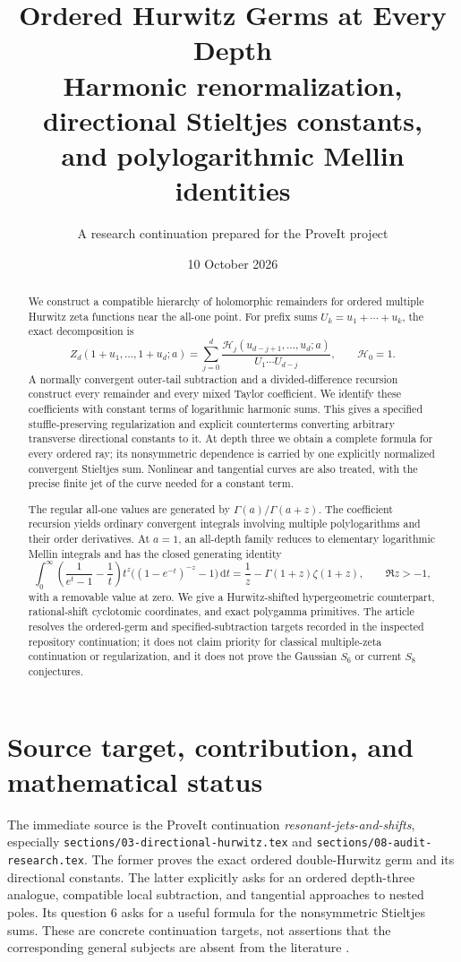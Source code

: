 \documentclass[11pt,a4paper]{article}
\title{\textbf{Ordered Hurwitz Germs at Every Depth}\\[5pt]
\large Harmonic renormalization, directional Stieltjes constants,\\
and polylogarithmic Mellin identities}
\author{A research continuation prepared for the ProveIt project}
\date{10 October 2026}
\numberwithin{equation}{section}
\theoremstyle{definition}\newtheorem{definition}[theorem]{Definition}
\theoremstyle{remark}\newtheorem{remark}[theorem]{Remark}
\newcommand{\HH}{\mathcal H}
\newcommand{\dd}{\,\mathrm d}
\newcommand{\src}[1]{{\small\nolinkurl{#1}}}
\begin{document}
\maketitle
\begin{abstract}
We construct a compatible hierarchy of holomorphic remainders for ordered
multiple Hurwitz zeta functions near the all-one point. For prefix sums
$U_k=u_1+\cdots+u_k$, the exact decomposition is
\[
 Z_d(1+u_1,\ldots,1+u_d;a)
 =\sum_{j=0}^{d}
 \frac{\HH_j(u_{d-j+1},\ldots,u_d;a)}{U_1\cdots U_{d-j}},
 \qquad \HH_0=1.
\]
A normally convergent outer-tail subtraction and a divided-difference
recursion construct every remainder and every mixed Taylor coefficient.
We identify these coefficients with constant terms of logarithmic harmonic
sums. This gives a specified stuffle-preserving regularization and explicit
counterterms converting arbitrary transverse directional constants to it.
At depth three we obtain a complete formula for every ordered ray; its
nonsymmetric dependence is carried by one explicitly normalized convergent
Stieltjes sum. Nonlinear and tangential curves are also treated, with the
precise finite jet of the curve needed for a constant term.

The regular all-one values are generated by $\Gamma(a)/\Gamma(a+z)$.
The coefficient recursion yields ordinary convergent integrals involving
multiple polylogarithms and their order derivatives. At $a=1$, an all-depth
family reduces to elementary logarithmic Mellin integrals and has the
closed generating identity
\[
 \int_0^\infty\left(\frac1{e^t-1}-\frac1t\right)t^z
       \bigl((1-e^{-t})^{-z}-1\bigr)\dd t
 =\frac1z-\Gamma(1+z)\zeta(1+z),\qquad \Re z>-1,
\]
with a removable value at zero. We give a Hurwitz-shifted hypergeometric
counterpart, rational-shift cyclotomic coordinates, and exact polygamma
primitives. The article resolves the ordered-germ and specified-subtraction
targets recorded in the inspected repository continuation; it does not
claim priority for classical multiple-zeta continuation or regularization,
and it does not prove the Gaussian $S_6$ or current $S_8$ conjectures.
\end{abstract}

\clearpage
\tableofcontents
\newpage

\section{Source target, contribution, and mathematical status}
\label{sec:scope}

The immediate source is the ProveIt continuation
\emph{resonant-jets-and-shifts}, especially
\src{sections/03-directional-hurwitz.tex} and
\src{sections/08-audit-research.tex}. The former proves the exact ordered
double-Hurwitz germ and its directional constants. The latter explicitly
asks for an ordered depth-three analogue, compatible local subtraction,
and tangential approaches to nested poles. Its question 6 asks for a useful
formula for the nonsymmetric Stieltjes sums. These are concrete continuation
targets, not assertions that the corresponding general subjects are absent
from the literature \cite{repo-target,repo-double}.
\end{document}
